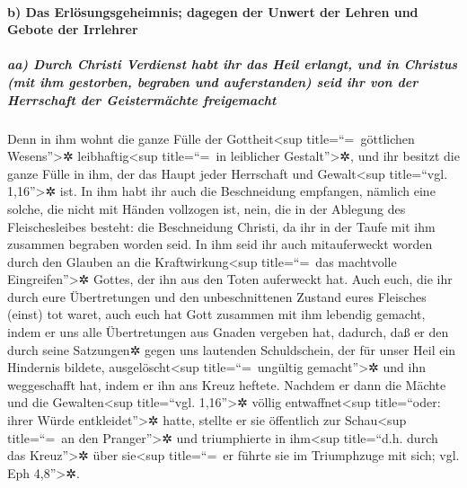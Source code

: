 \hypertarget{b-das-erluxf6sungsgeheimnis-dagegen-der-unwert-der-lehren-und-gebote-der-irrlehrer}{%
\paragraph{b) Das Erlösungsgeheimnis; dagegen der Unwert der Lehren und
Gebote der
Irrlehrer}\label{b-das-erluxf6sungsgeheimnis-dagegen-der-unwert-der-lehren-und-gebote-der-irrlehrer}}

\hypertarget{aa-durch-christi-verdienst-habt-ihr-das-heil-erlangt-und-in-christus-mit-ihm-gestorben-begraben-und-auferstanden-seid-ihr-von-der-herrschaft-der-geistermuxe4chte-freigemacht}{%
\subparagraph{aa) Durch Christi Verdienst habt ihr das Heil erlangt, und
in Christus (mit ihm gestorben, begraben und auferstanden) seid ihr von
der Herrschaft der Geistermächte
freigemacht}\label{aa-durch-christi-verdienst-habt-ihr-das-heil-erlangt-und-in-christus-mit-ihm-gestorben-begraben-und-auferstanden-seid-ihr-von-der-herrschaft-der-geistermuxe4chte-freigemacht}}

 Denn in ihm wohnt die ganze Fülle der
Gottheit\textless sup title=``=~göttlichen Wesens''\textgreater✲
leibhaftig\textless sup title=``=~in leiblicher Gestalt''\textgreater✲,
 und ihr besitzt die ganze Fülle in ihm, der das Haupt
jeder Herrschaft und Gewalt\textless sup title=``vgl.
1,16''\textgreater✲ ist.  In ihm habt ihr auch die
Beschneidung empfangen, nämlich eine solche, die nicht mit Händen
vollzogen ist, nein, die in der Ablegung des Fleischesleibes besteht:
die Beschneidung Christi,  da ihr in der Taufe mit ihm
zusammen begraben worden seid. In ihm seid ihr auch mitauferweckt worden
durch den Glauben an die Kraftwirkung\textless sup title=``=~das
machtvolle Eingreifen''\textgreater✲ Gottes, der ihn aus den Toten
auferweckt hat.  Auch euch, die ihr durch eure
Übertretungen und den unbeschnittenen Zustand eures Fleisches (einst)
tot waret, auch euch hat Gott zusammen mit ihm lebendig gemacht, indem
er uns alle Übertretungen aus Gnaden vergeben hat, 
dadurch, daß er den durch seine Satzungen✲ gegen uns lautenden
Schuldschein, der für unser Heil ein Hindernis bildete,
ausgelöscht\textless sup title=``=~ungültig gemacht''\textgreater✲ und
ihn weggeschafft hat, indem er ihn ans Kreuz heftete. 
Nachdem er dann die Mächte und die Gewalten\textless sup title=``vgl.
1,16''\textgreater✲ völlig entwaffnet\textless sup title=``oder: ihrer
Würde entkleidet''\textgreater✲ hatte, stellte er sie öffentlich zur
Schau\textless sup title=``=~an den Pranger''\textgreater✲ und
triumphierte in ihm\textless sup title=``d.h. durch das
Kreuz''\textgreater✲ über sie\textless sup title=``=~er führte sie im
Triumphzuge mit sich; vgl. Eph 4,8''\textgreater✲.


